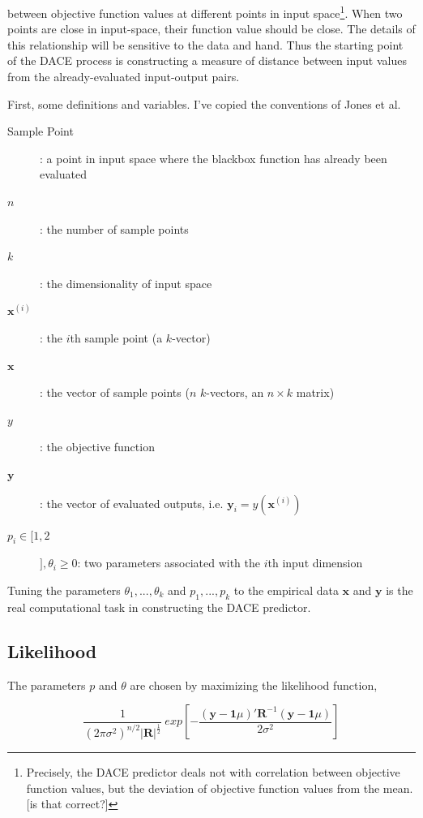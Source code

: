 \documentclass[letterpaper]{article}
\newcommand{\X}{\mathbf{x}}
\newcommand{\Y}{\mathbf{y}}
\newcommand{\mb}{\mathbf}
\begin{document}
between objective function values at different points in input space\footnote{Precisely, the DACE predictor deals not with correlation between objective function values, but the deviation of objective function values from the mean.[is that correct?]}. When two points are close in input-space, their function value should be close. The details of this relationship will be sensitive to the data and hand. Thus the starting point of the DACE process is constructing a measure of distance between input values from the already-evaluated input-output pairs. 


First, some definitions and variables. I've copied the conventions of Jones et al.

\begin{description}
  \item[Sample Point]: a point in input space where the blackbox function has already been evaluated
  \item[$n$]: the number of sample points
  \item[$k$]: the dimensionality of input space
  \item[$\X^{(i)}$]: the $i$th sample point (a $k$-vector)
  \item[$\X$]: the vector of sample points ($n$ $k$-vectors, an $n\times k$ matrix)
  \item[$y$]: the objective function
  \item[$\Y$]: the vector of evaluated outputs, i.e. $\Y_i=y(\X^{(i)})$
  \item[$p_i \in $[$1,2$]$], \theta_i \geq 0$: two parameters associated with the $i$th input dimension
\end{description}

Tuning the parameters $\theta_1,...,\theta_k$ and $p_1,...,p_k$ to the empirical data $\X$ and $\Y$ is the real computational task in constructing the DACE predictor.

\subsection{Likelihood} \label{sec:likelihood}

The parameters $p$ and $\theta$ are chosen by maximizing the likelihood function,

\begin{equation} \label{eq:likelihood}
\frac{1}
  {(2\pi\sigma^2)^{n/2}|\mb{R}|^\frac{1}{2}}\ 
exp \left 
  [ -\frac
    {(\mb{y}-\mb{1}\mu)'\mb{R}^{-1}(\mb{y}-\mb{1}\mu)}
    {2\sigma^2} 
\right ]
\end{equation}
\end{document}
